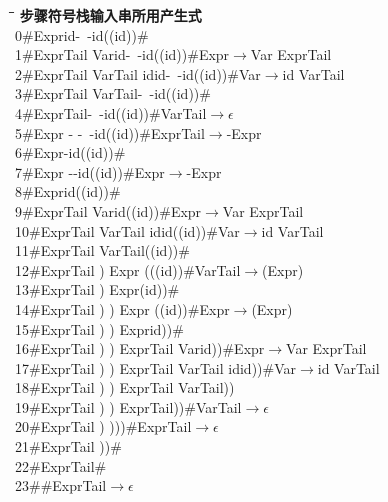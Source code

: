 \documentclass{article}
\begin{document}
\begin{tabbing}
    \hspace{1.5cm} \= \hspace{7cm}\= \hspace{3cm}\= \hspace{3cm}\= \kill
    \textbf{步骤}\>\textbf{符号栈}\>\textbf{输入串}\>\textbf{所用产生式}\\
    0\>\#Expr\>id-\ -id((id))\#\\
    1\>\#ExprTail Var\>id-\ -id((id))\#\>Expr$\rightarrow$Var ExprTail\\
    2\>\#ExprTail VarTail id\>id-\ -id((id))\#\>Var$\rightarrow$id VarTail\\
    3\>\#ExprTail VarTail\>-\ -id((id))\#\>\\
    4\>\#ExprTail\>-\ -id((id))\#\>VarTail$\rightarrow\epsilon$\\
    5\>\#Expr - \>-\ -id((id))\#\>ExprTail$\rightarrow$-Expr\\
    6\>\#Expr\>-id((id))\#\\
    7\>\#Expr -\>-id((id))\#\>Expr$\rightarrow$-Expr\\
    8\>\#Expr\>id((id))\#\>\\
    9\>\#ExprTail Var\>id((id))\#\>Expr$\rightarrow$Var ExprTail\\
    10\>\#ExprTail VarTail id\>id((id))\#\>Var$\rightarrow$id VarTail\\
    11\>\#ExprTail VarTail\>((id))\#\\
    12\>\#ExprTail ) Expr (\>((id))\#\>VarTail$\rightarrow$(Expr)\\
    13\>\#ExprTail ) Expr\>(id))\#\\
    14\>\#ExprTail ) ) Expr (\>(id))\#\>Expr$\rightarrow$(Expr)\\
    15\>\#ExprTail ) ) Expr\>id))\#\\
    16\>\#ExprTail ) ) ExprTail Var\>id))\#\>Expr$\rightarrow$Var ExprTail\\
    17\>\#ExprTail ) ) ExprTail VarTail id\>id))\#\>Var$\rightarrow$id VarTail\\
    18\>\#ExprTail ) ) ExprTail VarTail\>))\\
    19\>\#ExprTail ) ) ExprTail\>))\#\>VarTail$\rightarrow\epsilon$\\
    20\>\#ExprTail ) )\>))\#\>ExprTail$\rightarrow\epsilon$\\
    21\>\#ExprTail )\>)\#\\
    22\>\#ExprTail\>\#\\
    23\>\#\>\#\>ExprTail$\rightarrow\epsilon$\\
\end{tabbing}
\end{document}
